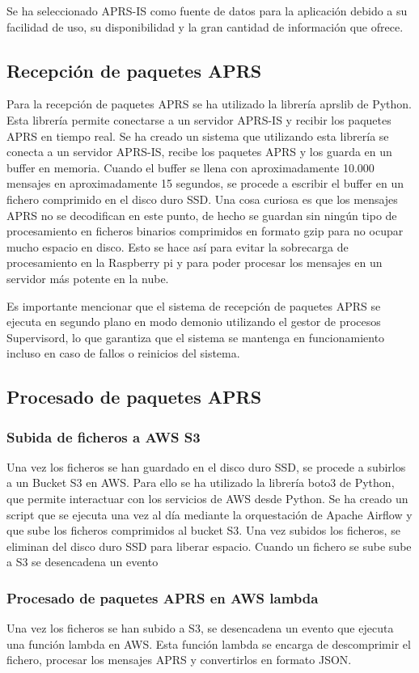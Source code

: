Se ha seleccionado APRS-IS como fuente de datos para la aplicación debido a su facilidad de uso, su disponibilidad y la gran cantidad de información que ofrece.

\subsection{Recepción de paquetes APRS}
Para la recepción de paquetes APRS se ha utilizado la librería aprslib de Python. Esta librería permite conectarse a un servidor APRS-IS y recibir los paquetes APRS en tiempo real. Se ha creado un sistema que utilizando esta librería se conecta a un servidor APRS-IS, recibe los paquetes APRS y los guarda en un buffer en memoria. Cuando el buffer se llena con aproximadamente 10.000 mensajes en aproximadamente 15 segundos, se procede a escribir el buffer en un fichero comprimido en el disco duro SSD.
Una cosa curiosa es que los mensajes APRS no se decodifican en este punto, de hecho se guardan sin ningún tipo de procesamiento en ficheros binarios comprimidos en formato gzip para no ocupar mucho espacio en disco. Esto se hace así para evitar la sobrecarga de procesamiento en la Raspberry pi y para poder procesar los mensajes en un servidor más potente en la nube.

Es importante mencionar que el sistema de recepción de paquetes APRS se ejecuta en segundo plano en modo demonio utilizando el gestor de procesos Supervisord, lo que garantiza que el sistema se mantenga en funcionamiento incluso en caso de fallos o reinicios del sistema.

\subsection{Procesado de paquetes APRS}
\subsubsection{Subida de ficheros a AWS S3}
Una vez los ficheros se han guardado en el disco duro SSD, se procede a subirlos a un Bucket S3 en AWS. Para ello se ha utilizado la librería boto3 de Python, que permite interactuar con los servicios de AWS desde Python. Se ha creado un script que se ejecuta una vez al día mediante la orquestación de Apache Airflow y que sube los ficheros comprimidos al bucket S3. Una vez subidos los ficheros, se eliminan del disco duro SSD para liberar espacio. Cuando un fichero se sube sube a S3 se desencadena un evento
\subsubsection{Procesado de paquetes APRS en AWS lambda}
Una vez los ficheros se han subido a S3, se desencadena un evento que ejecuta una función lambda en AWS. Esta función lambda se encarga de descomprimir el fichero, procesar los mensajes APRS y convertirlos en formato JSON.

